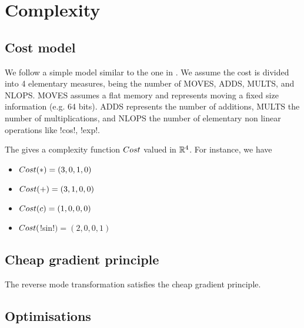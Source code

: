 \section{Complexity}
\label{sec:complexity}

\subsection{Cost model}

We follow a simple model similar to the one in \cite{griewank2008evaluating}.
We assume the cost is divided into 4 elementary measures, being the number of MOVES, ADDS, MULTS, and NLOPS.
MOVES assumes a flat memory and represents moving a fixed size information  (e.g. 64 bits). 
ADDS represents the number of additions, 
MULTS the number of multiplications, 
and NLOPS the number of elementary non linear operations like !cos!, !exp!.

The gives a complexity function $Cost$ valued in $\mathbb{R}^4$. 
For instance, we have 

\begin{itemize}
    \item $Cost(*)=(3,0,1,0)$
    \item $Cost(+)=(3,1,0,0)$
    \item $Cost(c)=(1,0,0,0)$
    \item $Cost($!sin!$)=(2,0,0,1)$
\end{itemize}



\subsection{Cheap gradient principle}

\begin{theorem}
    The reverse mode transformation satisfies the cheap gradient principle.
\end{theorem}

\subsection{Optimisations} %
\label{sub:Optimisations}


